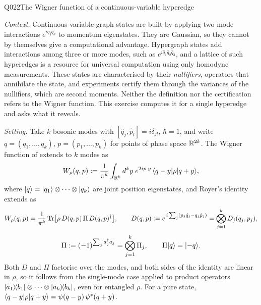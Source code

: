 \begin{entry}{Q022}{The Wigner function of a continuous-variable hyperedge}


\begin{problem}
\emph{Context.} Continuous-variable graph states are built by applying two-mode
interactions $e^{i\hat q_j\hat q_k}$ to momentum eigenstates. They are Gaussian, so they
cannot by themselves give a computational advantage. Hypergraph states add interactions
among three or more modes, such as $e^{i\hat q_1\hat q_2\hat q_3}$, and a lattice of such
hyperedges is a resource for universal computation using only homodyne measurements.
These states are characterised by their \emph{nullifiers}, operators that annihilate the
state, and experiments certify them through the variances of the nullifiers, which are
second moments. Neither the definition nor the certification refers to the Wigner
function. This exercise computes it for a single hyperedge and asks what it reveals.

\emph{Setting.} Take $k$ bosonic modes with $[\hat q_j,\hat p_l]=i\delta_{jl}$,
$\hbar=1$, and write $q=(q_1,\dots,q_k)$, $p=(p_1,\dots,p_k)$ for points of phase space
$\mathbb{R}^{2k}$. The Wigner function of  extends to $k$ modes as
\begin{equation}
  W_\rho(q,p):=\frac{1}{\pi^{k}}\int_{\mathbb{R}^{k}}d^{k}y\;e^{2ip\cdot y}\,
  \langle q-y \rvert\rho\lvert q+y \rangle,
  \label{q022:wigner}
\end{equation}
where $\lvert q \rangle=\lvert q_1 \rangle\otimes\cdots\otimes\lvert q_k \rangle$ are joint position
eigenstates, and Royer's identity extends as
\[
  W_\rho(q,p)=\frac{1}{\pi^{k}}\operatorname{Tr}\bigl[\rho\,D(q,p)\,\Pi\,D(q,p)^{\dagger}\bigr],
  \qquad
  D(q,p):=e^{\,i\sum_j(p_j\hat q_j-q_j\hat p_j)}=\bigotimes_{j=1}^{k}D_j(q_j,p_j),
\]
\[
  \Pi:=(-1)^{\sum_j a_j^{\dagger}a_j}=\bigotimes_{j=1}^{k}\Pi_j,
  \qquad
  \Pi\lvert q \rangle=\lvert -q \rangle.
\]
Both $D$ and $\Pi$ factorise over the modes, and both sides of the identity are linear in
$\rho$, so it follows from the single-mode case applied to product operators
$\lvert a_1 \rangle\!\langle b_1 \rvert\otimes\cdots\otimes\lvert a_k \rangle\!\langle b_k \rvert$, even for entangled $\rho$.
For a pure state, $\langle q-y \rvert\rho\lvert q+y \rangle=\psi(q-y)\,\psi^{*}(q+y)$.


\end{problem}
\end{entry}
